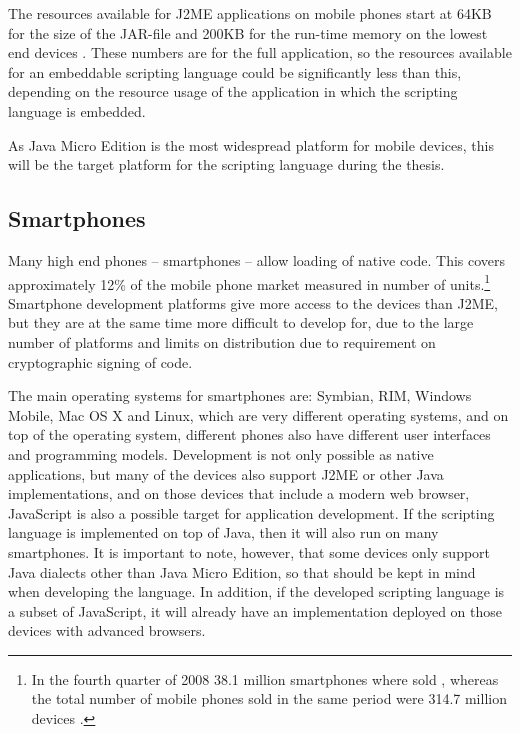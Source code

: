 \documentclass[11pt]{report}
\begin{document}
The resources available for J2ME applications on mobile phones start at 64KB for the size of the JAR-file and 200KB for the run-time memory on the lowest end devices \cite{nokia-optim}.
These numbers are for the full application, so the resources available for an embeddable scripting language could be significantly less than this, depending on the resource usage of the application in which the scripting language is embedded.

As Java Micro Edition is the most widespread platform for mobile devices, this will be the target platform for the scripting language during the thesis.

\subsection{Smartphones}
Many high end phones -- smartphones --  allow loading of native code. 
This covers approximately 12\% of the mobile phone market measured in number of units.\footnote{In the fourth quarter of 2008 38.1 million smartphones where sold \cite{gartner}, whereas the total number of mobile phones sold in the same period were 314.7 million devices \cite{cellular-news}.}
Smartphone development platforms give more access to the devices than J2ME, but they are at the same time more difficult to develop for, due to the large number of platforms and limits on distribution due to requirement on cryptographic signing of code.

The main operating systems for smartphones are: Symbian, RIM, Windows Mobile, Mac OS X and Linux, which are very different operating systems, and on top of the operating system, different phones also have different user interfaces and programming models.
Development is not only possible as native applications, but many of the devices also support J2ME or other Java implementations, and on those devices that include a modern web browser, JavaScript is also a possible target for application development.
If the scripting language is implemented on top of Java, then it will also run on many smartphones.  It is important to note, however, that some devices only support Java dialects other than Java Micro Edition, so that should be kept in mind when developing the language. In addition, if the developed scripting language is a subset of JavaScript, it will already have an implementation deployed on those devices with advanced browsers.
\end{document}
